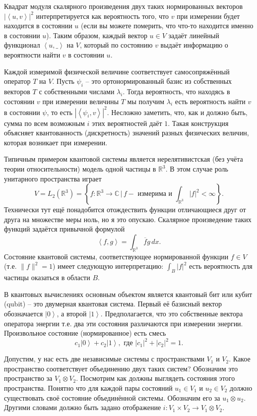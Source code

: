 \documentclass[10pt,a4paper,oneside]{book}
\theoremstyle{definition}
\newcommand{\mb}[1]{\mathbb{#1}}
\newcommand{\ovl}{\overline}
\def\lan{\left\langle }
\def\ran{\right\rangle}
\begin{document}
Квадрат модуля скалярного произведения двух таких нормированных векторов  $|\lan u,v \ran|^2$ интерпретируется как вероятность того, что  $v$ при измерении будет находится в состоянии $u$ (если вы можете померить, что что-то находится именно в состоянии $u$). Таким образом, каждый вектор $u\in V$ задаёт линейный функционал $\lan u, \_ \ran $ на $V$, который по состоянию $v$ выдаёт информацию о вероятности найти $v$ в состоянии $u$.

Каждой измеримой физической величине соответствует самосопряжённый оператор $T$ на $V$. Пусть $\psi_i$ -- это ортонормированный базис из собственных векторов $T$ с собственными числами $\lambda_i$. Тогда вероятность, что находясь в состоянии $v$ при измерении величины $T$ мы получим $\lambda_i$ есть вероятность найти $v$ в состоянии $\psi$, то есть $|\lan \psi_i, v \ran|^2$. Несложно заметить, что, как и должно быть, сумма по всем возможным $i$ этих вероятностей даёт $1$. Такая конструкция объясняет квантованность (дискретность) значений разных физических величин, которая возникает при измерении.

Типичным примером квантовой системы является нерелятивистская (без учёта теории относительности) модель одной частицы в $\mb R^3$. В этом случае роль унитарного пространства играет 
$$V= L_2(\mb R^3)=\left\{  f\colon \mb R^3 \to \mb C\, \Big| \, f - \text{ измерима и } \int_{\mb R^3} |f|^2<\infty \right\}.$$
Технически тут ещё понадобится отождествить функции отличающиеся друг от друга на множестве меры ноль, но я это опускаю. Скалярное произведение таких функций задаётся привычной формулой 
$$\lan f,g \ran = \int_{\mb R^3} \ovl{f}g\, dx.$$
Состояние квантовой системы, соответствующее нормированной функции $f\in V$ (т.е. $\|f\|^2=1$)  имеет следующую интерпретацию: $\int_{B} |f|^2$ есть вероятность для частицы оказаться в области $B$. 

 

В квантовых вычислениях основным объектом является квантовый бит или кубит (qubit) -- это двумерная квантовая система. Первый её базисный вектор обозначается $\left|0\ran$, а второй $ \left|1\ran$. Предполагается, что это собственные вектора оператора энергии т.е. два эти состояния различаются при измерении энергии. Произвольное состояние (нормированное) есть смесь 
$$c_1 \left|0\ran+ c_2 \left| 1\ran, \text{ где } |c_1|^2+|c_2|^2=1.$$
 

Допустим, у нас есть две независимые системы с пространствами $V_1$ и $V_2$. Какое пространство соответствует  объединению двух таких систем? Обозначим это пространство за $V_1\otimes V_2$. Посмотрим как должны выглядеть состояния этого пространства. Понятно что для каждой пары состояний $u_1\in V_1$ и $u_2\in V_2$ должно существовать своё состояние объединённой системы. Обозначим его за $u_1 \otimes u_2$. Другими словами должно быть задано отображение $i\colon V_1\times V_2\to V_1 \otimes V_2$.
\end{document}
